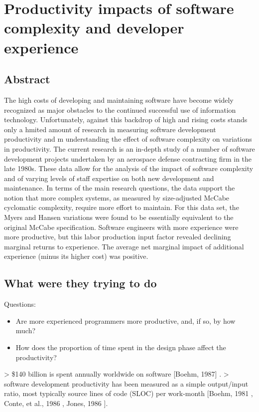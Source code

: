 \section{Productivity impacts of software complexity and developer experience}

\subsection{Abstract}

The high costs of developing and maintaining software have become widely recognized as major obstacles to the continued successful use of information technology. Unfortunately, against this backdrop of high and rising costs stands only a hmited amount of research in measuring software development productivity and m understanding the effect of software complexity on variations in productivity. The current research is an in-depth study of a number of software development projects undertaken by an aerospace defense contracting firm in the late 1980s. These data allow for the analysis of the impact of software complexity and of varying levels of staff expertise on both new development and maintenance. In terms of the main research questions, the data support the notion that more complex systems, as measured by size-adjusted McCabe cyclomatic complexity, require more effort to maintain. For this data set, the Myers and Hansen variations were found to be essentially equivalent to the original McCabe specification. Software engineers with more experience were more productive, but this labor production input factor revealed declining marginal returns to experience. The average net marginal impact of additional experience (minus its higher cost) was positive.

\subsection{What were they trying to do}

Questions:

\begin{itemize}
    \item Are more experienced programmers more productive, and, if so, by how much?
    \item How does the proportion of time spent in the design phase affect the productivity?
\end{itemize}

> \$140 billion is spent annually worldwide on software [Boehm, 1987] \cite{boehmImprovingSoftwareProductivity1987}.
> software development productivity has been measured as a simple output/input ratio, most typically source lines of code (SLOC) per work-month [Boehm, 1981 \cite{barry1981software}, Conte, et al., 1986 \cite{conteSoftwareEngineeringMetrics1986}, Jones, 1986 \cite{jonesProgrammingProductivity1985}].

